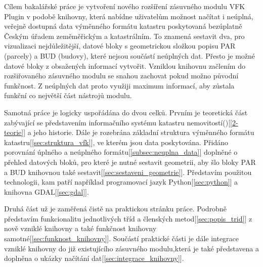 Cílem bakalářské práce je vytvoření nového rozšíření zásuvného modulu {VFK Plugin} v podobě knihovny, která nabídne uživatelům možnost načítat i neúplná, veřejně dostupná data výměnného formátu katastru poskytovaná bezúplatně Českým úřadem zeměměřickým a katastrálním.  To znamená sestavit dva, pro vizualizaci nejdůležitější, datové bloky s geometrickou složkou popisu PAR (parcely) a BUD (budovy), které nejsou součástí neúplných dat. Přesto je možné datové bloky z obsažených informací vytvořit. Vzniklou knihovnu začlením do rozšiřovaného zásuvného modulu se snahou zachovat pokud možno původní funkčnost. Z neúplných dat proto využiji maximum informací, aby zůstala funkční co největší část nástrojů modulu.

Samotná práce je logicky uspořádána do dvou celků. Prvním je
teoretická část zabývající se představením informačního systému
katastru nemovitostí()[\ref{2-teorie}] a jeho historie. Dále je rozebrána
základní struktura výměnného formátu katastru[\ref{sec:struktura_vfk}], ve kterém
jsou data poskytována. Přidáno porovnání úplného a neúplného formátu[\ref{subsec:neuplna_data}]
doplněné o přehled datových bloků, pro které je nutné sestavit
geometrii, aby šlo bloky PAR a BUD knihovnou také sestavit[\ref{sec:sestaveni_geometrie}]. Představím
použitou technologii, kam patří například programovací jazyk Python[\ref{sec:python}] a
knihovna GDAL[\ref{sec:gdal}].

Druhá část už je zaměřená čistě na praktickou stránku
práce. Podrobně představím funkcionalitu jednotlivých tříd a členských
metod[\ref{sec:popis_trid}] z nově vzniklé knihovny a také funkčnost knihovny
samotné[\ref{sec:funknost_knihovny}]. Součástí praktické části je dále integrace vzniklé knihovny do
již existujícího zásuvného modulu,která je také představena a
doplněna o ukázky načítání dat[\ref{sec:integrace_knihovny}].
